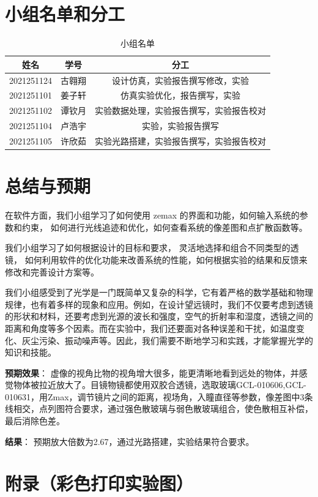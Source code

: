 \documentclass{article}
\begin{document}
\section{小组名单和分工}
% 
\begin{table}[H]
  \centering
  \begin{tabular}{ccc}
  \hline
  姓名&学号&分工\\ \hline
2021251124&古翱翔& 设计仿真，实验报告撰写修改，实验\\
2021251101&姜子轩& 仿真实验优化，报告撰写，实验\\
2021251102&谭钦月& 实验数据处理，实验报告撰写，实验报告校对\\
2021251104&卢浩宇& 实验，实验报告撰写\\
2021251105&许欣茹& 实验光路搭建，实验报告撰写，实验报告校对\\ \hline
  \end{tabular}
  \caption{小组名单}
  \end{table}

\section{总结与预期}
在软件方面，我们小组学习了如何使用 zemax 的界面和功能，如何输入系统的参数和约束，
如何进行光线追迹和优化，如何查看系统的像差图和点扩散函数等。

我们小组学习了如何根据设计的目标和要求，
灵活地选择和组合不同类型的透镜，
如何利用软件的优化功能来改善系统的性能，如何根据实验的结果和反馈来修改和完善设计方案等。

我们小组感受到了光学是一门既简单又复杂的科学，它有着严格的数学基础和物理规律，也有着多样的现象和应用。例如，在设计望远镜时，我们不仅要考虑到透镜的形状和材料，还要考虑到光源的波长和强度，空气的折射率和湿度，透镜之间的距离和角度等多个因素。而在实验中，我们还要面对各种误差和干扰，如温度变化、灰尘污染、振动噪声等。因此，我们需要不断地学习和实践，才能掌握光学的知识和技能。

\textbf{预期效果}：
虚像的视角比物的视角增大很多，能更清晰地看到远处的物体，并感觉物体被拉近放大了。目镜物镜都使用双胶合透镜，选取玻璃GCL-010606,GCL-010631，用Zmax，调节镜片之间的距离，视场角，入瞳直径等参数，像差图中3条线相交，点列图符合要求，通过强色散玻璃与弱色散玻璃组合，使色散相互补偿，最后消除色差。

\textbf{结果}：
预期放大倍数为2.67，通过光路搭建，实验结果符合要求。
\section{附录（彩色打印实验图）}
\end{document}
